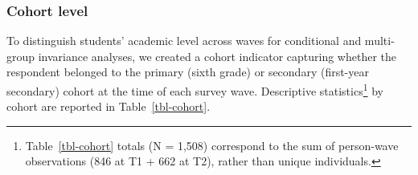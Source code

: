 \documentclass[
  13pt,
]{article}
\begin{document}
\subsubsection{Cohort level}\label{cohort-level}

To distinguish students' academic level across waves for conditional and
multi-group invariance analyses, we created a cohort indicator capturing
whether the respondent belonged to the primary (sixth grade) or
secondary (first-year secondary) cohort at the time of each survey wave.
Descriptive statistics\footnote{Table~\ref{tbl-cohort} totals (N =
  1,508) correspond to the sum of person-wave observations (846 at T1 +
  662 at T2), rather than unique individuals.} by cohort are reported in
Table~\ref{tbl-cohort}.

\begin{table}

\caption{\label{tbl-cohort}Descriptive statistics for cohort level}


\end{table}%
\end{document}
